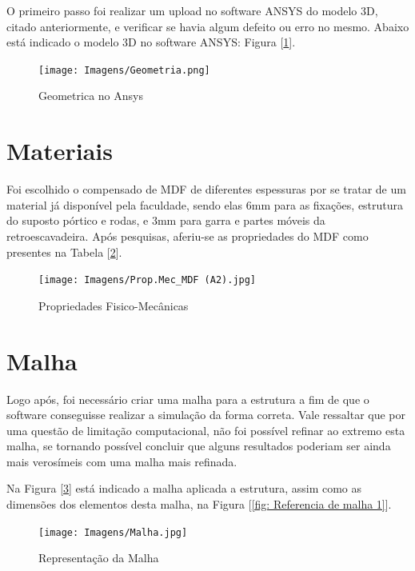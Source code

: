 \documentclass[deposito, acronym, symbols]{fei}
\begin{document}
O primeiro passo foi realizar um upload no software ANSYS do modelo 3D, citado anteriormente, e verificar se havia algum defeito ou erro no mesmo. Abaixo está indicado o modelo 3D no software ANSYS: Figura [\ref{fig: geometry}].

 \begin{figure}[!htb]
 \centering
    \caption{Geometrica no Ansys}
    \texttt{[image: Imagens/Geometria.png]}
    \label{fig: geometry}
 \end{figure}

\newpage

\section{Materiais}

 Foi escolhido o compensado de MDF de diferentes espessuras por se tratar de um material já disponível pela faculdade, sendo elas 6mm para as fixações, estrutura do suposto pórtico e rodas, e 3mm para garra e partes móveis da retroescavadeira.
 Após pesquisas, aferiu-se as propriedades do MDF como presentes na Tabela [\ref{fig: Prop.Mec_MDF (A2)}].

 \begin{figure}[!htb]
 \centering
    \caption{Propriedades Fisico-Mecânicas}
    \texttt{[image: Imagens/Prop.Mec\_MDF (A2).jpg]}
    \label{fig: Prop.Mec_MDF (A2)}
 \end{figure}
 
\section{Malha}

Logo após, foi necessário criar uma malha para a estrutura a fim de que o software conseguisse realizar a simulação da forma correta. Vale ressaltar que por uma questão de limitação computacional, não foi possível refinar ao extremo esta malha, se tornando possível concluir que alguns resultados poderiam ser ainda mais verosímeis com uma malha mais refinada.  

Na Figura [\ref{fig: malha}]  está indicado a malha aplicada a estrutura, assim como as dimensões dos elementos desta malha, na Figura [\ref{fig: Referencia de malha 1}].

 \begin{figure}[!htb]
 \centering
    \caption{Representação da Malha}
    \texttt{[image: Imagens/Malha.jpg]}
    \label{fig: malha}
 \end{figure}
\end{document}
